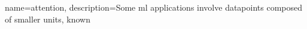 {name={attention}, 
	description={Some \gls{ml} applications involve \gls{datapoint}s composed of smaller units, known 
}}
